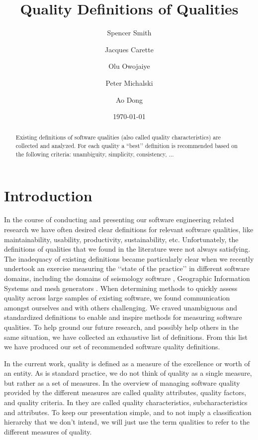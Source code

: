 \documentclass[letterpaper, cleveref]{lipics-v2019}
\title{Quality Definitions of Qualities}
\author{Spencer Smith}{McMaster University, Canada}{smiths@mcmaster.ca}{}{}
\author{Jacques Carette}{McMaster University, Canada}{carette@mcmaster.ca}{}{}
\author{Olu Owojaiye}{McMaster University, Canada}{owojaiyo@mcmaster.ca}{}{}
\author{Peter Michalski}{McMaster University, Canada}{michap@mcmaster.ca}{}{}
\author{Ao Dong}{McMaster University, Canada}{donga9@mcmaster.ca}{}{}
\date{\today}
\theoremstyle{definition}
\begin{document}
\maketitle

\begin{abstract}
	Existing definitions of software qualities (also called quality
  characteristics) are collected and analyzed.  For each quality a
  ``best'\rq{} definition is recommended based on the following criteria:
  unambiguity, simplicity, consistency, ...
\end{abstract}

\tableofcontents

\section{Introduction} \label{SecIntroduction}


In the course of conducting and presenting our software engineering related
research we have often desired clear definitions for relevant software
qualities, like maintainability, usability, productivity, sustainability, etc.
Unfortunately, the definitions of qualities that we found in the literature were
not always satisfying.  The inadequacy of existing definitions became
particularly clear when we recently undertook an exercise measuring the
\lq\lq{}state of the practice\rq\rq{} in different software domains, including
the domains of seismology software \citep{SmithEtAl2018}, Geographic Information
Systems \citep{SmithEtAl2018_arXivGIS} and mesh generators
\citep{smith2016state}. When determining methods to quickly assess quality
across large samples of existing software, we found communication amongst
ourselves and with others challenging. We craved unambiguous and standardized
definitions to enable and inspire methods for measuring software qualities.  To
help ground our future research, and possibly help others in the same situation,
we have collected an exhaustive list of definitions.  From this list we have
produced our set of recommended software quality definitions.  

In the current work, quality is defined as a measure of the excellence or worth
of an entity.  As is standard practice, we do not think of quality as a single
measure, but rather as a set of measures.  In the overview of managing software
quality provided by \citet[p 110]{VanVliet2000} the different measures are
called quality attributes, quality factors, and quality criteria.  In
\citet{ISO9126} they are called quality characteristics, subcharacteristics and
attributes.  To keep our presentation simple, and to not imply a classification
hierarchy that we don't intend, we will just use the term qualities to refer to
the different measures of quality.  
\end{document}
